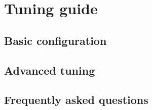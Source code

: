 \documentclass[a4paper,onecolumn,openany]{book}
\begin{document}
\lipsum

\part{Tuning guide}

\chapter{Basic configuration}

\lipsum

\chapter{Advanced tuning}

\lipsum

\chapter{Frequently asked questions}

\lipsum
\end{document}
